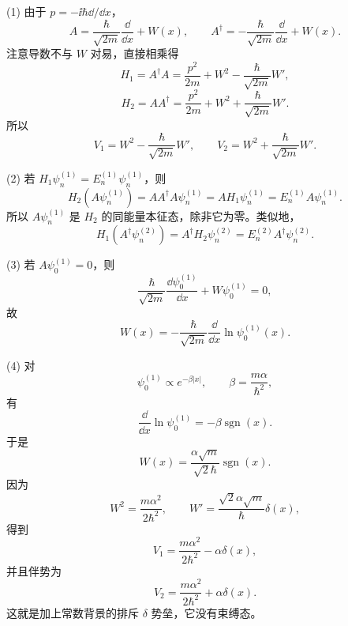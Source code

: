 \begin{solution}
(1) 由于 $p=-\ii\hbar\dd/\dd x$，
\[
A=\frac{\hbar}{\sqrt{2m}}\frac{\dd}{\dd x}+W(x),
\qquad
A^\dagger=-\frac{\hbar}{\sqrt{2m}}\frac{\dd}{\dd x}+W(x).
\]
注意导数不与 $W$ 对易，直接相乘得
\[
H_1=A^\dagger A=\frac{p^2}{2m}+W^2-\frac{\hbar}{\sqrt{2m}}W',
\]
\[
H_2=AA^\dagger=\frac{p^2}{2m}+W^2+\frac{\hbar}{\sqrt{2m}}W'.
\]
所以
\[
\boxed{V_1=W^2-\frac{\hbar}{\sqrt{2m}}W',
\qquad
V_2=W^2+\frac{\hbar}{\sqrt{2m}}W'.}
\]

(2) 若 $H_1\psi_n^{(1)}=E_n^{(1)}\psi_n^{(1)}$，则
\[
H_2(A\psi_n^{(1)})=AA^\dagger A\psi_n^{(1)}=A H_1\psi_n^{(1)}
=E_n^{(1)}A\psi_n^{(1)}.
\]
所以 $A\psi_n^{(1)}$ 是 $H_2$ 的同能量本征态，除非它为零。类似地，
\[
H_1(A^\dagger\psi_n^{(2)})=A^\dagger H_2\psi_n^{(2)}
=E_n^{(2)}A^\dagger\psi_n^{(2)}.
\]

(3) 若 $A\psi_0^{(1)}=0$，则
\[
\frac{\hbar}{\sqrt{2m}}\frac{\dd\psi_0^{(1)}}{\dd x}+W\psi_0^{(1)}=0,
\]
故
\[
\boxed{W(x)=-\frac{\hbar}{\sqrt{2m}}\frac{\dd}{\dd x}\ln\psi_0^{(1)}(x).}
\]

(4) 对
\[
\psi_0^{(1)}\propto e^{-\beta|x|},
\qquad
\beta=\frac{m\alpha}{\hbar^2},
\]
有
\[
\frac{\dd}{\dd x}\ln\psi_0^{(1)}=-\beta\operatorname{sgn}(x).
\]
于是
\[
\boxed{W(x)=\frac{\alpha\sqrt m}{\sqrt2\hbar}\operatorname{sgn}(x).}
\]
因为
\[
W^2=\frac{m\alpha^2}{2\hbar^2},
\qquad
W'=\frac{\sqrt2\alpha\sqrt m}{\hbar}\delta(x),
\]
得到
\[
V_1=\frac{m\alpha^2}{2\hbar^2}-\alpha\delta(x),
\]
并且伴势为
\[
\boxed{V_2=\frac{m\alpha^2}{2\hbar^2}+\alpha\delta(x).}
\]
这就是加上常数背景的排斥 $\delta$ 势垒，它没有束缚态。
\end{solution}

